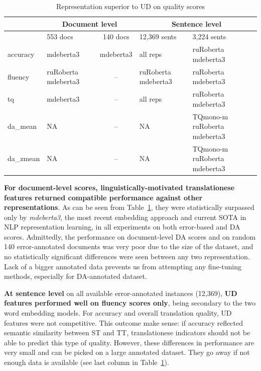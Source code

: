 \begin{table}[H]
	\centering
	\begin{tabular}{l|p{2cm}c||p{3cm}p{3cm}}
		\toprule
		& \multicolumn{2}{c||}{Document level} & \multicolumn{2}{c}{Sentence level} \\
		\midrule
		& 553 docs & 140 docs   & 12,369 sents & 3,224 sents  \\
		\midrule
		accuracy   & mdeberta3 & mdeberta3 & all reps & ruRoberta mdeberta3 \\
		fluency    & ruRoberta mdeberta3 & -- & ruRoberta mdeberta3 & ruRoberta mdeberta3 \\
		tq         & mdeberta3 & -- & all reps & ruRoberta mdeberta3 \\
		\midrule
		da\_mean   & NA & -- & NA & TQmono-m ruRoberta mdeberta3 \\
		da\_zmean  & NA & -- & NA & TQmono-m ruRoberta mdeberta3 \\
		\bottomrule
	\end{tabular}
	\caption{\label{tab:_ud_vs_all}Representation superior to UD on quality scores}
\end{table}

\textbf{For document-level scores, linguistically-motivated translationese features returned compatible performance against other representations}. As can be seen from Table~\ref{tab:_ud_vs_all}, they were statistically surpassed only by \textit{mdeberta3}, the most recent embedding approach and current SOTA in NLP representation learning, in all experiments on both error-based and DA scores. Admittedly, the performance on document-level DA scores and on random 140 error-annotated documents was very poor due to the size of the dataset, and no statistically significant differences were seen between any two representation. 
Lack of a bigger annotated data prevents us from attempting any fine-tuning methods, especially for DA-annotated dataset.

\textbf{At sentence level} on all available error-annotated instances (12,369), \textbf{UD features performed well on fluency scores only}, being secondary to the two word embedding models. For accuracy and overall translation quality, UD features were not competitive. This outcome make sense: if accuracy reflected semantic similarity between ST and TT, translationese indicators should not be able to predict this type of quality. However, these differences in performance are very small and can be picked on a large annotated dataset. They go away if not enough data is available (see last column in Table~\ref{tab:_ud_vs_all}).

